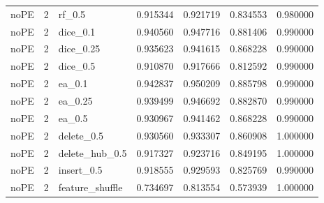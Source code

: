 \documentclass[UTF8,a4paper,11pt,fontset=fandol]{ctexart}
\begin{document}
{\begin{longtable}{lrlrrrr}
noPE & 2 & rf\_0.5 & 0.915344 & 0.921719 & 0.834553 & 0.980000 \\
noPE & 2 & dice\_0.1 & 0.940560 & 0.947716 & 0.881406 & 0.990000 \\
noPE & 2 & dice\_0.25 & 0.935623 & 0.941615 & 0.868228 & 0.990000 \\
noPE & 2 & dice\_0.5 & 0.910870 & 0.917666 & 0.812592 & 0.990000 \\
noPE & 2 & ea\_0.1 & 0.942837 & 0.950209 & 0.885798 & 0.990000 \\
noPE & 2 & ea\_0.25 & 0.939499 & 0.946692 & 0.882870 & 0.990000 \\
noPE & 2 & ea\_0.5 & 0.930967 & 0.941462 & 0.868228 & 0.990000 \\
noPE & 2 & delete\_0.5 & 0.930560 & 0.933307 & 0.860908 & 1.000000 \\
noPE & 2 & delete\_hub\_0.5 & 0.917327 & 0.923716 & 0.849195 & 1.000000 \\
noPE & 2 & insert\_0.5 & 0.918555 & 0.929593 & 0.825769 & 0.990000 \\
noPE & 2 & feature\_shuffle & 0.734697 & 0.813554 & 0.573939 & 1.000000 \\
\end{longtable}
}
\end{document}
